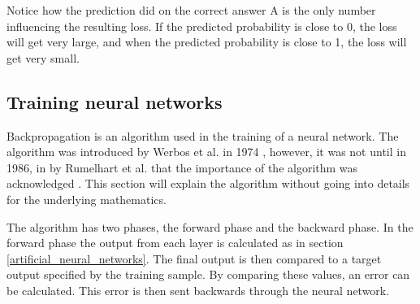 Notice how the prediction did on the correct answer A is the only number influencing the resulting loss. If the predicted probability is close to 0, the loss will get very large, and when the predicted probability is close to 1, the loss will get very small. \cite{brownlee_how_2017}

\subsection{Training neural networks}
\label{training_with_backpropagation}

Backpropagation is an algorithm used in the training of a neural network. The algorithm was introduced by Werbos et al. in 1974 \cite{werbos_beyond_1974}, however, it was not until in 1986, in \cite{rumelhart_learning_1986} by Rumelhart et al. that the importance of the algorithm was acknowledged \cite{_backpropagation_????-1}. This section will explain the algorithm without going into details for the underlying mathematics. 

The algorithm has two phases, the forward phase and the backward phase. In the forward phase the output from each layer is calculated as in section \ref{artificial_neural_networks}. The final output is then compared to a target output specified by the training sample. By comparing these values, an error can be calculated. This error is then sent backwards through the neural network.




